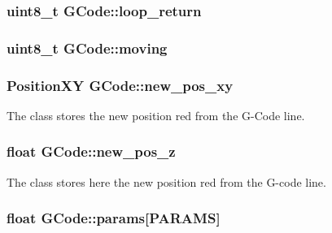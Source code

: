 \hypertarget{class_g_code_a600deaa28b54bd8fca4d8eb51fb09b55}{
\subsubsection[{loop\+\_\+return}]{\setlength{\rightskip}{0pt plus 5cm}uint8\+\_\+t G\+Code\+::loop\+\_\+return}}\label{class_g_code_a600deaa28b54bd8fca4d8eb51fb09b55}
\hypertarget{class_g_code_ae84ec0e15b18d91420c39627d1bdf78a}{
\subsubsection[{moving}]{\setlength{\rightskip}{0pt plus 5cm}uint8\+\_\+t G\+Code\+::moving}}\label{class_g_code_ae84ec0e15b18d91420c39627d1bdf78a}
\hypertarget{class_g_code_a996f87623f8a0263c3a7761060330de0}{
\subsubsection[{new\+\_\+pos\+\_\+xy}]{\setlength{\rightskip}{0pt plus 5cm}Position\+X\+Y G\+Code\+::new\+\_\+pos\+\_\+xy}}\label{class_g_code_a996f87623f8a0263c3a7761060330de0}


The class stores the new position red from the G-\/\+Code line. 

\hypertarget{class_g_code_acd3b6b2ecfc46bff229fbfd7ba72930f}{
\subsubsection[{new\+\_\+pos\+\_\+z}]{\setlength{\rightskip}{0pt plus 5cm}float G\+Code\+::new\+\_\+pos\+\_\+z}}\label{class_g_code_acd3b6b2ecfc46bff229fbfd7ba72930f}


The class stores here the new position red from the G-\/code line. 

\hypertarget{class_g_code_a6f38c9dddbd7c12c786c6363fd2a369c}{
\subsubsection[{params}]{\setlength{\rightskip}{0pt plus 5cm}float G\+Code\+::params\mbox{[}{\bf P\+A\+R\+A\+M\+S}\mbox{]}}}\label{class_g_code_a6f38c9dddbd7c12c786c6363fd2a369c}



